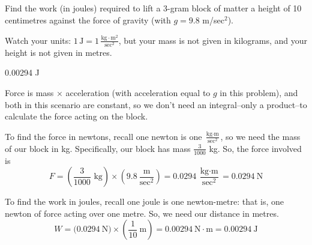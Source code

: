 %
%

\subsection*{\Conceptual}

\begin{question}
Find the work (in joules) required to lift a 3-gram block of matter a height of 10 centimetres against the force of gravity (with $g=9.8$ m/sec$^2$).
\end{question}
\begin{hint}
Watch your units: $1 \,\mathrm{J} = 1\, \frac{\mathrm{kg}\cdot\mathrm{m}^2}{\mathrm{sec}^2}$, but your mass is not given in kilograms, and your height is not given in metres.
\end{hint}
\begin{answer}
0.00294 J
\end{answer}
\begin{solution}
Force is mass $\times$ acceleration (with acceleration equal to $g$ in this problem), and both in this scenario are constant, so we don't need an integral--only a product--to calculate the force acting on the block.

To find the force in newtons, recall one newton is one $\frac{\text{kg}\cdot\text{m}}{\text{sec}^2}$, so we need the mass of our block in kg. Specifically, our block has mass $\frac{3}{1000}$ kg. So, the force involved is
\[F=\left(\frac{3}{1000}\text{ kg}\right)\times\left(9.8~\frac{\text{m}}{\text{sec}^2}\right) = 0.0294~\frac{\text{kg}\cdot\text{m}}{\text{sec}^2} = 0.0294~\text{N}\]

To find the work in joules, recall one joule is one newton-metre: that is, one newton of force acting over one metre. So, we need our distance in metres.
\[W = \big( 0.0294~\text{N}\big)\times\left(\frac{1}{10}~\text{m}\right) = 0.00294~\text{N}\cdot\text{m} = 0.00294~\text{J}\]
\end{solution}

